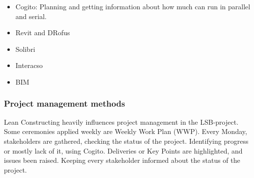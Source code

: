 \begin{itemize}
    \item Cogito: Planning and getting information about how much can run in parallel and serial. 
    \item Revit and DRofus
    \item Solibri
    \item Interacso
    \item BIM
\end{itemize}
 
\subsubsection{Project management methods} 
Lean Constructing heavily influences project management in the LSB-project. Some ceremonies applied weekly are Weekly Work Plan (WWP). Every Monday, stakeholders are gathered, checking the status of the project. Identifying progress or mostly lack of it, using Cogito. Deliveries or Key Points are highlighted, and issues been raised. Keeping every stakeholder informed about the status of the project. 


\cleardoublepage